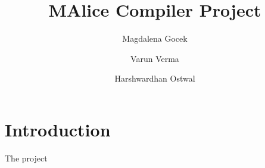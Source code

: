 \documentclass[a4wide, 11pt]{article}
\begin{document}
\title{MAlice Compiler Project}

\author{Magdalena Gocek \and Varun Verma \and Harshwardhan Ostwal}

\maketitle            %

\section{Introduction}
\label{sec:intro}
	The project
\end{document}
